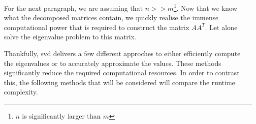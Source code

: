 For the next paragraph, we are assuming that $n>>m$\footnote{$n$ is significantly larger than $m$}.
Now that we know what the decomposed matrices contain, we quickly realise the immense computational power that is required to construct the matrix $AA^T$.
Let alone solve the eigenvalue problem to this matrix.

Thankfully, \gls{svd} delivers a few different approches to either efficiently compute the eigenvalues or to accurately approximate the values. 
These methods significantly reduce the required computational resources.
In order to contrast this, the following methods that will be considered will compare the runtime complexity.



\clearpage
